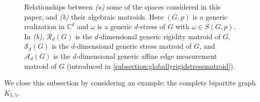 \documentclass[11pt,a4paper,dvipsnames]{scrartcl}
\theoremstyle{definition}
\newcommand{\CC}{\mathbb{C}}
\newcommand{\stressmatroid}[2]{\mathcal{S}_{#1}(#2)}
\newcommand{\affinematroid}[2]{\mathcal{A}_{#1}(#2)}
\newcommand{\stresskernel}[2]{K_{{#1},{#2}}}
\newcommand{\contactlocus}[2]{L_{#1,#2}}
\newcommand{\affineedge}[2]{A(#1,#2)}
\DeclareMathOperator{\aff}{Affine}
\newcommand{\affine}[2]{\aff(#2)}
\begin{document}
\begin{figure}[tb]
    \centering
    \begin{subfigure}[b]{0.49\linewidth}
    \centering
{}
\caption{}
\end{subfigure}
\begin{subfigure}[b]{0.49\linewidth}
\centering
{}
\caption{}
\end{subfigure}
    \caption{Relationships between \textit{(a)} some of the spaces considered in this paper, and \textit{(b)} their algebraic matroids. Here $(G,p)$ is a generic realization in $\CC^d$ and $\omega$ is a generic $d$-stress of $G$ with $\omega \in S(G,p)$. In \textit{(b)}, $\mathcal{R}_d(G)$ is the $d$-dimensional generic rigidity matroid of $G$, $\stressmatroid{d}{G}$ is the $d$-dimensional generic stress matroid of $G$, and $\affinematroid{d}{G}$ is the $d$-dimensional generic affine edge measurement matroid of $G$ (introduced in \cref{subsection:globallyrigidstressmatroid}).}
    \label{fig:diag2}
\end{figure}



We close this subsection by considering an example: the complete bipartite graph $K_{5,5}$.
\end{document}
